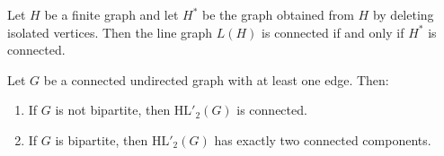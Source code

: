 \documentclass[10pt,a4paper]{amsart}
\newcommand{\HL}{\mathrm{HL}}
\begin{document}
\begin{theorem}\label{thm:linegraph-connectivity}
Let $H$ be a finite graph and let $H^\ast$ be the graph obtained from $H$ by deleting isolated vertices.
Then the line graph $L(H)$ is connected if and only if $H^\ast$ is connected.
\end{theorem}

\begin{theorem}\label{thm:symmetric-connectedness}
Let \(G\) be a connected undirected graph with at least one edge. Then:
\begin{enumerate}
  \item If \(G\) is not bipartite, then \(\HL'_2(G)\) is connected.
  \item If \(G\) is bipartite, then \(\HL'_2(G)\) has exactly two connected components.
\end{enumerate}
\end{theorem}
\end{document}
